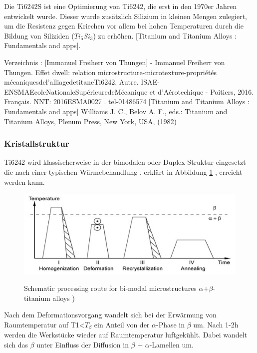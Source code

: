 Die Ti6242S ist eine Optimierung von Ti6242, die erst in den 1970er Jahren  entwickelt wurde. Dieser wurde zusätzlich Silizium in kleinen Mengen zulegiert, um die Resistenz gegen Kriechen vor allem bei hohen Temperaturen durch die Bildung von Siliziden ($Ti_5Si_3$) zu erhöhen.  [Titanium and Titanium Alloys : Fundamentals and apps]. 

Verzeichnis : [Immanuel Freiherr von Thungen] - Immanuel Freiherr von Thungen. Effet dwell: relation microstructure-microtexture-propriétés mécaniquesdel’alliagedetitaneTi6242. Autre. ISAE-ENSMAEcoleNationaleSupérieuredeMécanique et d’Aérotechique - Poitiers, 2016. Français. NNT: 2016ESMA0027 .  tel-01486574
[Titanium and Titanium Alloys : Fundamentals and apps] Williams J. C., Belov A. F., eds.: Titanium and Titanium Alloys, Plenum Press, New York, USA, (1982) 


\subsubsection{Kristallstruktur}

Ti6242 wird klassischerweise in der bimodalen oder Duplex-Struktur eingesetzt die nach einer typischen Wärmebehandlung , erklärt in Abbildung \ref{WB} , erreicht  werden kann.

\begin{figure}[H]
	
	\centering
	
	{\includegraphics[width=1\textwidth]{Bilder/WB}}			
	\caption{Schematic processing route for bi-modal microstructures $\alpha$+$\beta$-titanium alloys )}
	\label{WB}
\end{figure}
Nach dem Deformationsvorgang wandelt sich bei der Erwärmung von Raumtemperatur  auf \hspace{1ex} T1<$T_{\beta}$  ein Anteil von der $\alpha$-Phase in $\beta$ um. Nach 1-2h werden die Werkstücke wieder auf Raumtemperatur luftgekühlt.
Dabei wandelt sich das $\beta$ unter Einfluss der Diffusion in $\beta$ + $\alpha$-Lamellen um.

